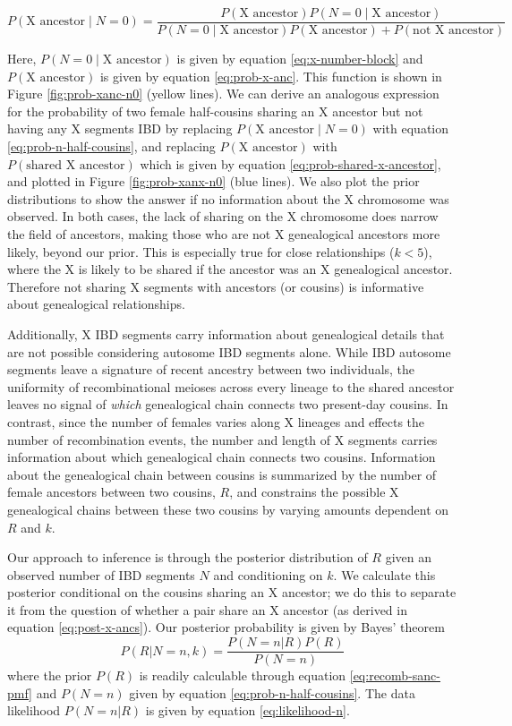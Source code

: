 \documentclass[11pt]{article}
\begin{document}
\begin{equation}
  \label{eq:post-x-ancs}
  P(\text{X ancestor} \;|\; N = 0) = \frac{P(\text{X ancestor})P(N = 0 \;|\; \text{X ancestor})}{P(N = 0 \;|\; \text{X ancestor})P(\text{X ancestor}) + P(\text{not X ancestor})}
\end{equation}

Here, $P(N = 0  \;|\; \text{X ancestor})$ is given by equation
\eqref{eq:x-number-block} and $P(\text{X ancestor})$ is given by equation
\eqref{eq:prob-x-anc}. This function is shown in Figure \ref{fig:prob-xanc-n0}
(yellow lines). We can derive an analogous expression for the probability of
two female half-cousins sharing an X ancestor but not having any X segments IBD
by replacing $P(\text{X ancestor} \;|\; N = 0)$ with equation
\eqref{eq:prob-n-half-cousins}, and replacing $P(\text{X ancestor})$ with
$P(\text{shared X ancestor})$ which is given by equation
\eqref{eq:prob-shared-x-ancestor}, and plotted in Figure \ref{fig:prob-xanx-n0}
(blue lines). We also plot the prior distributions to show the answer if no
information about the X chromosome was observed. In both cases, the lack of
sharing on the X chromosome does narrow the field of ancestors, making those
who are not X genealogical ancestors more likely, beyond our prior. This is
especially true for close relationships ($k<5$), where the X is likely to be
shared if the ancestor was an X genealogical ancestor. Therefore not sharing X
segments with ancestors (or cousins) is informative about genealogical
relationships.

Additionally, X IBD segments carry information about genealogical details that
are not possible considering autosome IBD segments alone. While IBD autosome
segments leave a signature of recent ancestry between two individuals, the
uniformity of recombinational meioses across every lineage to the shared
ancestor leaves no signal of \emph{which} genealogical chain connects two
present-day cousins. In contrast, since the number of females varies along X
lineages and effects the number of recombination events, the number and length
of X segments carries information about which genealogical chain connects two
cousins. Information about the genealogical chain between cousins is summarized
by the number of female ancestors between two cousins, $R$, and constrains the
possible X genealogical chains between these two cousins by varying amounts
dependent on $R$ and $k$.

Our approach to inference is through the posterior distribution of $R$ given an
observed number of IBD segments $N$ and conditioning on $k$. We calculate this
posterior conditional on the cousins sharing an X ancestor; we do this to
separate it from the question of whether a pair share an X ancestor (as derived
in equation \eqref{eq:post-x-ancs}). Our posterior probability is given by
Bayes' theorem
%
\begin{equation}
  P(R | N = n, k) = \frac{P(N = n | R) P(R)}{P(N=n)}
\end{equation}
%
where the prior $P(R)$ is readily calculable through equation
\eqref{eq:recomb-sanc-pmf} and $P(N=n)$ given by equation
\eqref{eq:prob-n-half-cousins}. The data likelihood $P(N = n | R)$ is given by
equation \eqref{eq:likelihood-n}.
\end{document}
